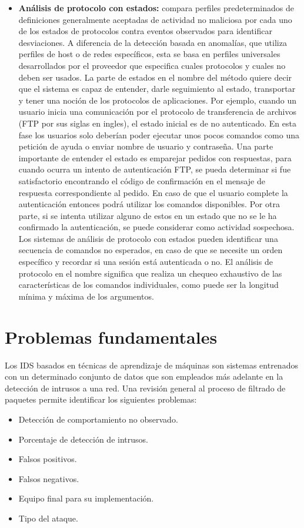 \begin{itemize}
    \item \textbf{Análisis de protocolo con estados:} compara perfiles predeterminados de definiciones generalmente aceptadas de actividad no maliciosa por cada uno de los estados de protocolos contra eventos observados para identificar desviaciones. A diferencia de la detección basada en anomalías, que utiliza perfiles de host o de redes específicos, esta se basa en perfiles universales desarrollados por el proveedor que especifica cuales protocolos y cuales no deben ser usados. La parte de estados en el nombre del método quiere decir que el sistema es capaz de entender, darle seguimiento al estado, transportar y tener una noción de los protocolos de aplicaciones. Por ejemplo, cuando un usuario inicia una comunicación por el protocolo de transferencia de archivos (FTP por sus siglas en ingles), el estado inicial es de no autenticado. En esta fase los usuarios solo deberían poder ejecutar unos pocos comandos como una petición de ayuda o enviar nombre de usuario y contraseña. Una parte importante de entender el estado es emparejar pedidos con respuestas, para cuando ocurra un intento de autenticación FTP, se pueda determinar si fue satisfactorio encontrando el código de confirmación en el mensaje de respuesta correspondiente al pedido. En caso de que el usuario complete la autenticación entonces podrá utilizar los comandos disponibles. Por otra parte, si se intenta utilizar alguno de estos en un estado que no se le ha confirmado la autenticación, se puede considerar como actividad sospechosa. Los sistemas de análisis de protocolo con estados pueden identificar una secuencia de comandos no esperados, en caso de que se necesite un orden específico y recordar si una sesión está autenticada o no. El análisis de protocolo en el nombre significa que realiza un chequeo exhaustivo de las características de los comandos individuales, como puede ser la longitud mínima y máxima de los argumentos.
\end{itemize}

\section{Problemas fundamentales}
Los IDS basados en técnicas de aprendizaje de máquinas son sistemas entrenados con un determinado conjunto de datos que son empleados más adelante en la detección de intrusos a una red. Una revisión general al proceso de filtrado de paquetes permite identificar los siguientes problemas:
\begin{itemize}
    \item Detección de comportamiento no observado.
    \item Porcentaje de detección de intrusos.
    \item Falsos positivos.
    \item Falsos negativos.
    \item Equipo final para su implementación.
    \item Tipo del ataque.
\end{itemize}

